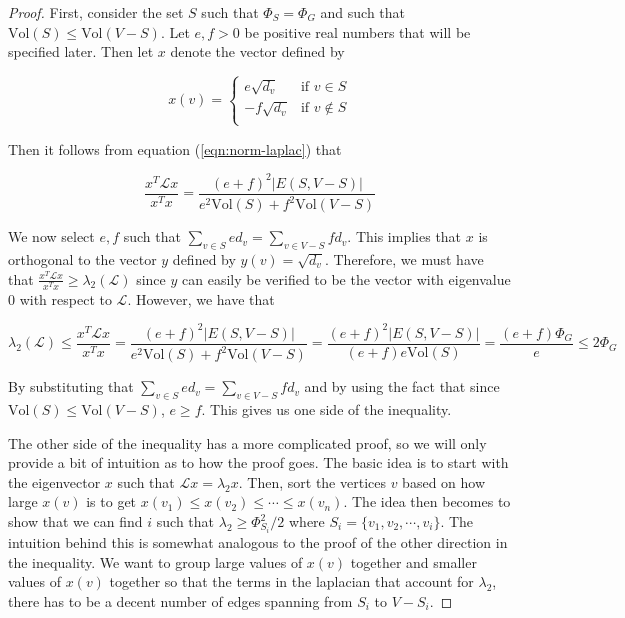 \documentclass[12pt,twoside]{article}
\begin{document}
\begin{proof}
First, consider the set $S$ such that $\Phi_S = \Phi_G$ and such that $\text{Vol}(S) \leq \text{Vol}(V - S)$. Let $e,f > 0$ be positive real numbers that will be specified later. Then let $x$ denote the vector defined by

\begin{equation*}
x(v)  = 
            \begin{cases}
                e\sqrt{d_v}     &\mbox{if $v \in S$} \\
                -f\sqrt{d_v}    &\mbox{if $v \notin S$} \\
            \end{cases}
\end{equation*}

Then it follows from equation (\ref{eqn:norm-laplac}) that

\begin{equation*}
\frac{x^T\mathcal{L}x}{x^Tx} = \frac{(e+f)^2|E(S,V-S)|}{e^2\text{Vol}(S) + f^2\text{Vol}(V - S)}
\end{equation*}

We now select $e,f$ such that $\sum_{v \in S} e d_v = \sum_{v \in V-S} f d_v$. This implies that $x$ is orthogonal to the vector $y$ defined by $y(v) = \sqrt{d_v}$. Therefore, we must have that $\frac{x^T \mathcal{L} x}{x^T x} \geq \lambda_2(\mathcal{L})$ since $y$ can easily be verified to be the vector with eigenvalue 0 with respect to $\mathcal{L}$. However, we have that

\begin{equation*}
\lambda_2(\mathcal{L}) \leq \frac{x^T\mathcal{L}x}{x^Tx}  
    = \frac{(e+f)^2|E(S,V-S)|}{e^2\text{Vol}(S) + f^2\text{Vol}(V - S)} 
    = \frac{(e+f)^2|E(S,V-S)|}{(e + f)e\text{Vol}(S)} 
    = \frac{(e+f)\Phi_G}{e} \leq 2\Phi_G
\end{equation*}

 
By substituting that $\sum_{v \in S} e d_v = \sum_{v \in V-S} f d_v$ and by using the fact that since $\text{Vol}(S) \leq \text{Vol}(V - S)$, $e \geq f$. This gives us one side of the inequality. 
 
The other side of the inequality has a more complicated proof, so we will only provide a bit of intuition as to how the proof goes. The basic idea is to start with the eigenvector $x$ such that $\mathcal{L}x = \lambda_2x$. Then, sort the vertices $v$ based on how large $x(v)$ is to get $x(v_1) \leq x(v_2) \leq \cdots \leq x(v_n)$. The idea then becomes to show that we can find $i$ such that $\lambda_2 \geq \Phi_{S_i}^2/2$ where $S_i = \{v_1, v_2, \cdots, v_i\}$. The intuition behind this is somewhat analogous to the proof of the other direction in the inequality. We want to group large values of $x(v)$ together and smaller values of $x(v)$ together so that the terms in the laplacian that account for $\lambda_2$, there has to be a decent number of edges spanning from $S_i$ to $V - S_i$. 

\end{proof}
\end{document}
